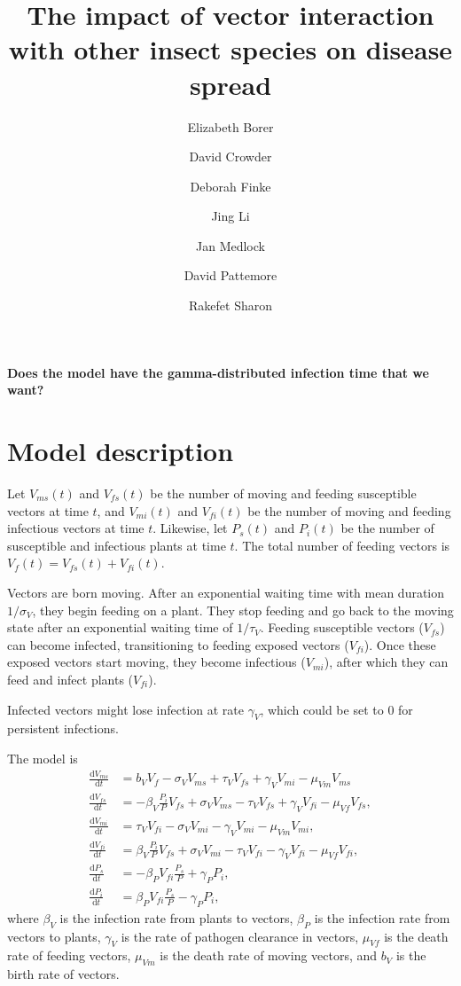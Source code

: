 \documentclass{article}
\title{The impact of vector interaction with other insect species on
  disease spread}
\author{
  Elizabeth Borer
  \and
  David Crowder
  \and
  Deborah Finke
  \and
  Jing Li
  \and
  Jan Medlock
  \and
  David Pattemore
  \and
  Rakefet Sharon
}
\newcommand{\md}{\mathrm{d}}
\begin{document}
\maketitle

\textbf{Does the model have the gamma-distributed infection time that
  we want?}


\section{Model description}



Let $V_{ms}(t)$ and $V_{fs}(t)$ be the number of moving and feeding
susceptible vectors at time $t$, and $V_{mi}(t)$ and $V_{fi}(t)$ be
the number of moving and feeding infectious vectors at time $t$.
Likewise, let $P_s(t)$ and $P_i(t)$ be the number of susceptible and
infectious plants at time $t$.  The total number of feeding vectors is
$V_f(t) = V_{fs}(t) + V_{fi}(t)$.

Vectors are born moving.  After an exponential waiting time with mean
duration $1 / \sigma_V$, they begin feeding on a plant.  They stop
feeding and go back to the moving state after an exponential waiting
time of $1 / \tau_V$.  Feeding susceptible vectors ($V_{fs}$) can
become infected, transitioning to feeding exposed vectors ($V_{fi}$).
Once these exposed vectors start moving, they become infectious
($V_{mi}$), after which they can feed and infect plants ($V_{fi}$).

Infected vectors might lose infection at rate $\gamma_V$, which could
be set to $0$ for persistent infections.

The model is
\begin{equation}
  \label{odesystemnumbers}
  \begin{split}
    \frac{\md V_{ms}}{\md t}
    &=
    b_V V_f
    - \sigma_V V_{ms}
    + \tau_V V_{fs}
    + \gamma_V V_{mi}
    - \mu_{Vm} V_{ms}
    \\
    \frac{\md V_{fs}}{\md t}
    &=
    - \beta_V \frac{P_i}{P} V_{fs}
    + \sigma_V V_{ms}
    - \tau_V V_{fs}
    + \gamma_V V_{fi}
    - \mu_{Vf} V_{fs},
    \\
    \frac{\md V_{mi}}{\md t}
    &=
    \tau_V V_{fi}
    - \sigma_V V_{mi}
    - \gamma_V V_{mi}
    - \mu_{Vm} V_{mi},
    \\
    \frac{\md V_{fi}}{\md t}
    &=
    \beta_V \frac{P_i}{P} V_{fs}
    + \sigma_V V_{mi}
    - \tau_V V_{fi}
    - \gamma_V V_{fi}
    - \mu_{Vf} V_{fi},
    \\
    \frac{\md P_s}{\md t}
    &=
    - \beta_P V_{fi} \frac{P_s}{P} + \gamma_P P_i,
    \\
    \frac{\md P_i}{\md t}
    &=
    \beta_P V_{fi} \frac{P_s}{P} - \gamma_P P_i,
  \end{split}
\end{equation}
where $\beta_V$ is the infection rate from plants to vectors,
$\beta_P$ is the infection rate from vectors to plants, $\gamma_V$ is
the rate of pathogen clearance in vectors, $\mu_{Vf}$ is the death rate
of feeding vectors, $\mu_{Vm}$ is the death rate of moving vectors,
and $b_V$ is the birth rate of vectors.
\end{document}
